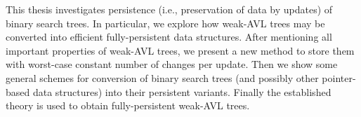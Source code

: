 \documentclass[12pt]{report}
\begin{document}
This thesis investigates persistence (i.e., preservation of data by updates) of binary search trees. 
In particular, we explore how weak-AVL trees may be converted into efficient fully-persistent data structures.
After mentioning all important properties of weak-AVL trees, we present a new method to store them with worst-case constant number of changes per update. 
Then we show some general schemes for conversion of binary search trees (and possibly other pointer-based data structures) into their persistent variants. 
Finally the established theory is used to obtain fully-persistent weak-AVL trees.
\end{document}
